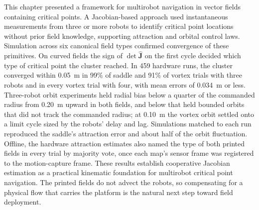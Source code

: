 This chapter presented a framework for multirobot navigation in vector fields containing critical points. A Jacobian-based approach used instantaneous measurements from three or more robots to identify critical point locations without prior field knowledge, supporting attraction and orbital control laws. Simulation across six canonical field types confirmed convergence of these primitives. On curved fields the sign of $\det\hat{\mathbf{J}}$ on the first cycle decided which type of critical point the cluster reached. In 459 hardware runs, the cluster converged within 0.05~m in 99\% of saddle and 91\% of vortex trials with three robots and in every vortex trial with four, with mean errors of 0.034~m or less. Three-robot orbit experiments held radial bias below a quarter of the commanded radius from 0.20~m upward in both fields, and below that held bounded orbits that did not track the commanded radius; at 0.10~m the vortex orbit settled onto a limit cycle sized by the robots' delay and lag. Simulations matched to each run reproduced the saddle's attraction error and about half of the orbit fluctuation.
Offline, the hardware attraction estimates also named the type of both printed fields in every trial by majority vote, once each map's sensor frame was registered to the motion-capture frame. These results establish cooperative Jacobian estimation as a practical kinematic foundation for multirobot critical point navigation. The printed fields do not advect the robots, so compensating for a physical flow that carries the platform is the natural next step toward field deployment.
